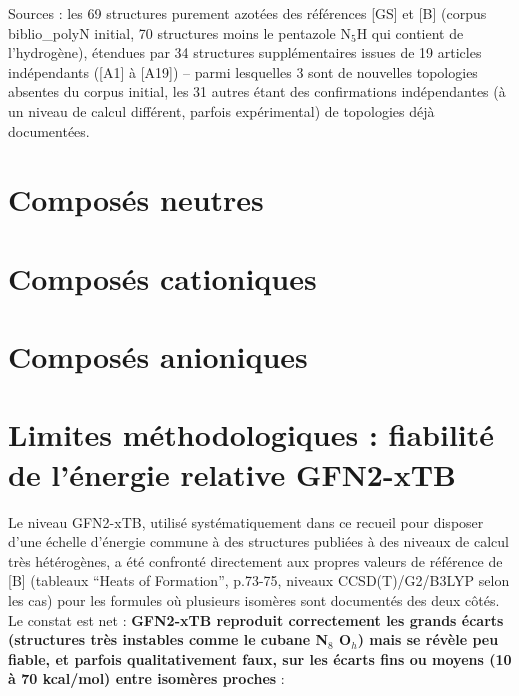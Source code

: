 \documentclass[11pt,a4paper]{article}
\begin{document}
Sources : les 69 structures purement azot\'ees des r\'ef\'erences [GS] et
[B] (corpus biblio\_polyN initial, 70 structures moins le pentazole
N$_5$H qui contient de l'hydrog\`ene), \'etendues par 34 structures
suppl\'ementaires
issues de 19 articles ind\'ependants ([A1] \`a [A19]) -- parmi lesquelles 3
sont de nouvelles topologies absentes du corpus initial, les 31 autres
\'etant des confirmations ind\'ependantes (\`a un niveau de calcul
diff\'erent, parfois exp\'erimental) de topologies d\'ej\`a document\'ees.

\section{Compos\'es neutres}



\section{Compos\'es cationiques}



\section{Compos\'es anioniques}



\section{Limites m\'ethodologiques : fiabilit\'e de l'\'energie relative GFN2-xTB}
\label{sec:limites-gfn2}

Le niveau GFN2-xTB, utilis\'e syst\'ematiquement dans ce recueil pour
disposer d'une \'echelle d'\'energie commune \`a des structures publi\'ees
\`a des niveaux de calcul tr\`es h\'et\'erog\`enes, a \'et\'e confront\'e
directement aux propres valeurs de r\'ef\'erence de [B] (tableaux
``Heats of Formation'', p.73-75, niveaux CCSD(T)/G2/B3LYP selon les cas)
pour les formules o\`u plusieurs isom\`eres sont document\'es des deux
c\^ot\'es. Le constat est net : \textbf{GFN2-xTB reproduit correctement les
grands \'ecarts (structures tr\`es instables comme le cubane N$_8$
O$_h$) mais se r\'ev\`ele peu fiable, et parfois qualitativement faux, sur
les \'ecarts fins ou moyens (10 \`a 70 kcal/mol) entre isom\`eres proches}
:
\end{document}
